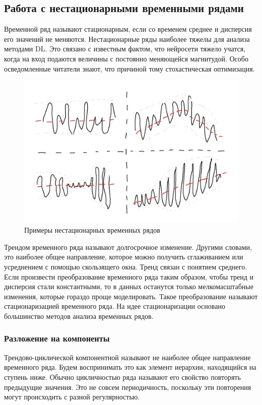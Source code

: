 \documentclass[12pt,fleqn]{article}
\begin{document}
\subsection{Работа с нестационарными временными рядами}

Временной ряд называют стационарным, если со временем среднее и дисперсия его значений не меняются. Нестационарные ряды наиболее тяжелы для анализа методами DL. Это связано с известным фактом, что нейросети тяжело учатся, когда на вход подаются величины с постоянно меняющейся магнитудой. Особо осведомленные читатели знают, что причиной тому стохастическая оптимизация.

\begin{figure}[!htb]
    \centering
    \includegraphics[width=0.5\linewidth]{illustrations/stationarity.jpg}
    \caption{Примеры нестационарных временных рядов}
    \label{fig:stationarity}
\end{figure}

Трендом временного ряда называют долгосрочное изменение. Другими словами, это наиболее общее направление, которое можно получить сглаживанием или усреднением с помощью скользящего окна. Тренд связан с понятием среднего. Если произвести преобразование временного ряда таким образом, чтобы тренд и дисперсия стали константными, то в данных останутся только мелкомасштабные изменения, которые гораздо проще моделировать. Такое преобразование называют стационаризацией временного ряда. На идее стационаризации основано большинство методов анализа временных рядов.

\subsubsection{Разложение на компоненты}

Трендово-циклической компонентной называют не наиболее общее направление временного ряда. Будем воспринимать это как элемент иерархии, находящийся на ступень ниже. Обычно цикличностью ряда называют его свойство повторять предыдущие значения. Это не совсем периодичность, поскольку эти повторения могут происходить с разной регулярностью.
\end{document}
